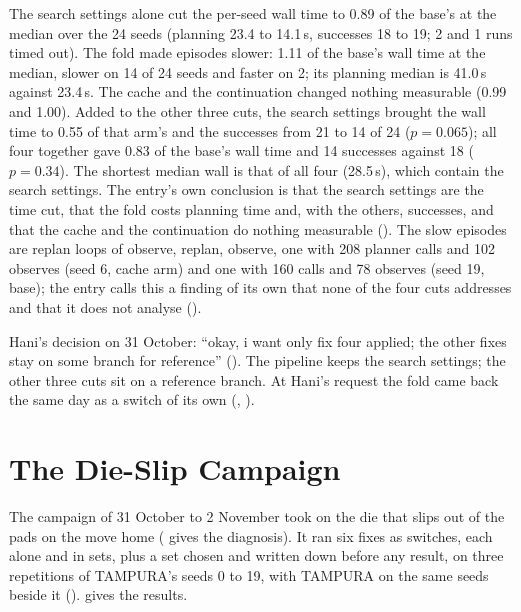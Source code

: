 The search settings alone cut the per-seed wall time to 0.89 of the base's at the
median over the 24 seeds (planning 23.4 to 14.1\,s, successes 18 to 19; 2 and 1 runs
timed out). The fold made episodes slower: 1.11 of the base's wall time at the
median, slower on 14 of 24 seeds and faster on 2; its planning median is 41.0\,s
against 23.4\,s. The cache and the continuation changed nothing measurable (0.99 and
1.00). Added to the other three cuts, the search settings brought the wall time to
0.55 of that arm's and the successes from 21 to 14 of 24 ($p = 0.065$); all four
together gave 0.83 of the base's wall time and 14 successes against 18 ($p = 0.34$).
The shortest median wall is that of all four (28.5\,s), which contain the search
settings. The entry's own conclusion is that the
search settings are the time cut, that the fold costs planning time and, with the
others, successes, and that the cache and the continuation do nothing measurable
(). The slow episodes are replan loops of observe, replan, observe, one
with 208 planner calls and 102 observes (seed 6, cache arm) and one with 160 calls
and 78 observes (seed 19, base); the entry calls this a finding of its own that
none of the four cuts addresses and that it does not analyse ().

Hani's decision on 31 October: ``okay, i want only fix four applied; the other
fixes stay on some branch for reference'' (). The pipeline keeps the search
settings; the other three cuts sit on a reference branch. At Hani's request the
fold came back the same day as a switch of its own (, ).

\section{The Die-Slip Campaign}
\label{sec:slip-campaign}

The campaign of 31 October to 2 November took on the die that slips out of the
pads on the move home ( gives the diagnosis). It ran six
fixes as switches, each alone and in sets, plus a set chosen and written down
before any result, on three repetitions of TAMPURA's seeds 0 to 19, with TAMPURA
on the same seeds beside it ().  gives the results.


